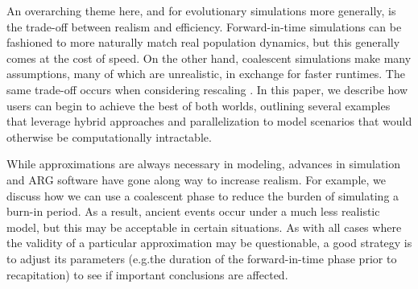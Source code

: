 \documentclass[12pt]{article}
\newcommand*{\eg}{e.g.\xcomma}
\begin{document}
An overarching theme here, and for evolutionary simulations more generally, is the trade-off between realism and efficiency.
Forward-in-time simulations can be fashioned to more naturally match real population dynamics,
but this generally comes at the cost of speed. On the other hand, coalescent simulations make many assumptions, many of which
are unrealistic, in exchange for faster runtimes.
The same trade-off occurs when considering rescaling \citep{cury_simulation_2022,dabi_population_2025}.
In this paper, we describe how users can begin to achieve the best of both worlds,
outlining several examples that leverage hybrid approaches and parallelization to model scenarios that would otherwise be
computationally intractable.

While approximations are always necessary in modeling, advances in simulation and ARG software have gone along way to increase realism.
For example, we discuss how we
can use a coalescent phase to reduce the burden of simulating a burn-in period.
As a result, ancient events occur under a much less realistic model, but this may be acceptable in certain situations.
As with all cases where the validity of a particular approximation may be questionable, a good strategy is to adjust its parameters
(\eg the duration of the forward-in-time phase prior to recapitation) to see if important conclusions are affected.










\newpage
\appendix
\end{document}
